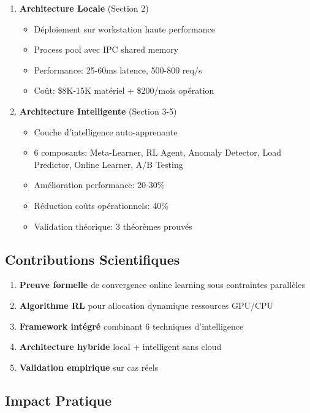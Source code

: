 \documentclass[12pt,a4paper]{article}
\begin{document}
\begin{enumerate}
    \item \textbf{Architecture Locale} (Section 2)
    \begin{itemize}
        \item Déploiement sur workstation haute performance
        \item Process pool avec IPC shared memory
        \item Performance: 25-60ms latence, 500-800 req/s
        \item Coût: \$8K-15K matériel + \$200/mois opération
    \end{itemize}
    
    \item \textbf{Architecture Intelligente} (Section 3-5)
    \begin{itemize}
        \item Couche d'intelligence auto-apprenante
        \item 6 composants: Meta-Learner, RL Agent, Anomaly Detector, Load Predictor, Online Learner, A/B Testing
        \item Amélioration performance: 20-30\%
        \item Réduction coûts opérationnels: 40\%
        \item Validation théorique: 3 théorèmes prouvés
    \end{itemize}
\end{enumerate}

\subsection{Contributions Scientifiques}

\begin{enumerate}
    \item \textbf{Preuve formelle} de convergence online learning sous contraintes parallèles
    \item \textbf{Algorithme RL} pour allocation dynamique ressources GPU/CPU
    \item \textbf{Framework intégré} combinant 6 techniques d'intelligence
    \item \textbf{Architecture hybride} local + intelligent sans cloud
    \item \textbf{Validation empirique} sur cas réels
\end{enumerate}

\subsection{Impact Pratique}
\end{document}
